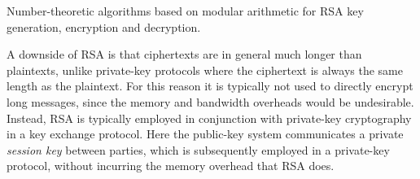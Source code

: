 \begin{table}[!htb]
\caption{Number-theoretic algorithms based on modular arithmetic for RSA key generation, encryption and decryption.} \label{alg:RSA}
\end{table}

A downside of RSA is that ciphertexts are in general much longer than plaintexts, unlike private-key protocols where the ciphertext is always the same length as the plaintext. For this reason it is typically not used to directly encrypt long messages, since the memory and bandwidth overheads would be undesirable. Instead, RSA is typically employed in conjunction with private-key cryptography in a key exchange protocol. Here the public-key system communicates a private \textit{session key} between parties, which is subsequently employed in a private-key protocol, without incurring the memory overhead that RSA does.  

